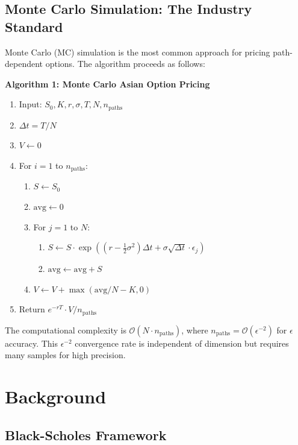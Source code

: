 \documentclass[12pt]{article}
\begin{document}
\subsection{Monte Carlo Simulation: The Industry Standard}

Monte Carlo (MC) simulation is the most common approach for pricing path-dependent options. The algorithm proceeds as follows:

\textbf{Algorithm 1: Monte Carlo Asian Option Pricing}

\begin{enumerate}
    \item Input: $S_0, K, r, \sigma, T, N, n_{\text{paths}}$
    \item $\Delta t = T/N$
    \item $V \gets 0$
    \item For $i = 1$ to $n_{\text{paths}}$:
    \begin{enumerate}
        \item $S \gets S_0$
        \item $\text{avg} \gets 0$
        \item For $j = 1$ to $N$:
        \begin{enumerate}
            \item $S \gets S \cdot \exp\left((r - \frac{1}{2}\sigma^2)\Delta t + \sigma\sqrt{\Delta t}\cdot\epsilon_j\right)$
            \item $\text{avg} \gets \text{avg} + S$
        \end{enumerate}
        \item $V \gets V + \max(\text{avg}/N - K, 0)$
    \end{enumerate}
    \item Return $e^{-rT} \cdot V / n_{\text{paths}}$
\end{enumerate}

The computational complexity is $\mathcal{O}(N \cdot n_{\text{paths}})$, where $n_{\text{paths}} = \mathcal{O}(\epsilon^{-2})$ for $\epsilon$ accuracy. This $\epsilon^{-2}$ convergence rate is independent of dimension but requires many samples for high precision.

\section{Background}

\subsection{Black-Scholes Framework}
\end{document}
